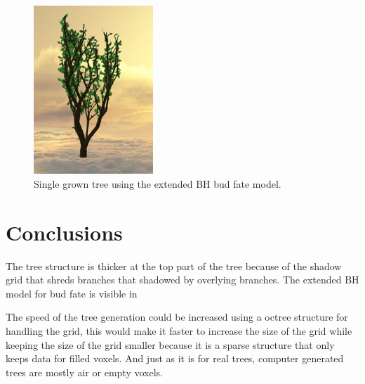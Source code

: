 \documentclass[11pt]{article} %
\begin{document}
\begin{figure}[htp]
	\centering
	\includegraphics[width=0.4\textwidth]{1tree.png}
	\caption{Single grown tree using the extended BH bud fate model.}
	\label{fig:res_1tree}
\end{figure}




\section{Conclusions}
The tree structure is thicker at the top part of the tree because of the shadow grid that shreds branches that shadowed by overlying branches.
The extended BH model for bud fate is visible in 


The speed of the tree generation could be increased using a octree structure for handling the grid, this would make it faster to increase the size of the grid while keeping the size of the grid smaller because it is a sparse structure that only keeps data for filled voxels.
And just as it is for real trees, computer generated trees are mostly air or empty voxels.




\end{document}

